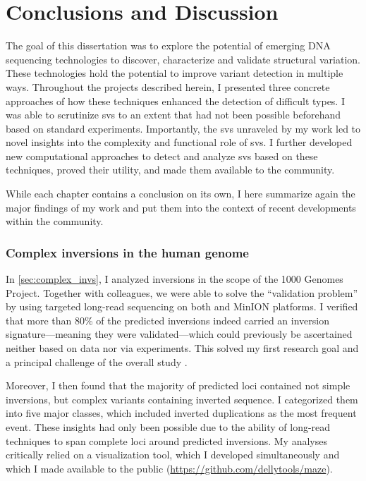 \chapter{Conclusions and Discussion}
\label{sec:conclusions}

The goal of this dissertation was to explore the potential of emerging DNA
sequencing technologies to discover, characterize and validate structural
variation. These technologies hold the potential to improve variant detection in
multiple ways. Throughout the projects described herein, I presented three
concrete approaches of how these techniques enhanced the detection of difficult
\sv types. I was able to scrutinize \acp{sv} to an extent that had not been
possible beforehand based on standard \mps experiments. Importantly, the
\acp{sv} unraveled by my work led to novel insights into the complexity and
functional role
of \acp{sv}. I further developed new computational approaches to detect and
analyze \acp{sv} based on these techniques, proved their utility, and made
them available to the community.

While each chapter contains a conclusion on its own, I here summarize again the
major findings of my work and put them into the context of recent developments
within the community.



\subsection{Complex inversions in the human genome}

In \cref{sec:complex_invs}, I analyzed inversions in the scope of the 1000
Genomes Project. Together with colleagues, we were able to solve the
``validation problem'' by using targeted long-read sequencing on both \pacbio
and \ont MinION platforms. I verified that more than 80\% of the predicted
inversions indeed carried an inversion signature---meaning they were
validated---which could previously be ascertained neither based on \mps data nor
via \pcr experiments. This solved my first research goal and a principal
challenge of the overall study \citep{Sudmant2015}.

Moreover, I then found that
the majority of predicted loci contained not simple inversions, but complex
variants containing inverted sequence. I categorized them into five major
classes, which included inverted duplications as the most frequent event. These
insights had only been possible due to the ability of long-read techniques to
span complete loci around predicted inversions. My analyses critically relied on
a visualization tool, which I developed simultaneously and which I made
available to the public (\url{https://github.com/dellytools/maze}).

